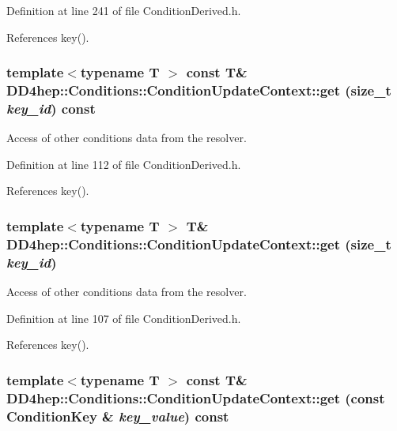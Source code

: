 Definition at line 241 of file ConditionDerived.h.

References key().\hypertarget{class_d_d4hep_1_1_conditions_1_1_condition_update_context_a34da25c719917d2602a8cb0db15fbfa4}{
\subsubsection[{get}]{\setlength{\rightskip}{0pt plus 5cm}template$<$typename T $>$ const {\bf T}\& DD4hep::Conditions::ConditionUpdateContext::get (size\_\-t {\em key\_\-id}) const}}
\label{class_d_d4hep_1_1_conditions_1_1_condition_update_context_a34da25c719917d2602a8cb0db15fbfa4}


Access of other conditions data from the resolver. 

Definition at line 112 of file ConditionDerived.h.

References key().\hypertarget{class_d_d4hep_1_1_conditions_1_1_condition_update_context_ab2e3942153fd60a5be7e30771a18fd7f}{
\subsubsection[{get}]{\setlength{\rightskip}{0pt plus 5cm}template$<$typename T $>$ {\bf T}\& DD4hep::Conditions::ConditionUpdateContext::get (size\_\-t {\em key\_\-id})}}
\label{class_d_d4hep_1_1_conditions_1_1_condition_update_context_ab2e3942153fd60a5be7e30771a18fd7f}


Access of other conditions data from the resolver. 

Definition at line 107 of file ConditionDerived.h.

References key().\hypertarget{class_d_d4hep_1_1_conditions_1_1_condition_update_context_a5f11d0ff6f0c68a535646bdc4260ec94}{
\subsubsection[{get}]{\setlength{\rightskip}{0pt plus 5cm}template$<$typename T $>$ const {\bf T}\& DD4hep::Conditions::ConditionUpdateContext::get (const {\bf ConditionKey} \& {\em key\_\-value}) const}}
\label{class_d_d4hep_1_1_conditions_1_1_condition_update_context_a5f11d0ff6f0c68a535646bdc4260ec94}


